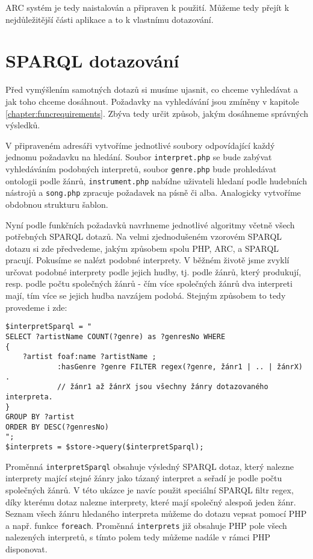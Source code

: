 ARC systém je tedy naistalován a připraven k použití. Můžeme tedy přejít k nejdůležitější části aplikace a to k vlastnímu dotazování. 

\section{SPARQL dotazování}

Před vymýšlením samotných dotazů si musíme ujasnit, co chceme vyhledávat a jak toho chceme dosáhnout. Požadavky na vyhledávání jsou zmíněny v kapitole \ref{chapter:funcrequirements}.
Zbýva tedy určit způsob, jakým dosáhneme správných výsledků. 

V připraveném adresáři vytvoříme jednotlivé soubory odpovídající každý jednomu požadavku na hledání.
Soubor \verb|interpret.php| se bude zabývat vyhledáváním podobných interpretů,
soubor \verb|genre.php| bude prohledávat ontologii podle žánrů,
\verb|instrument.php| nabídne uživateli hledaní podle hudebních nástrojů a 
\verb|song.php| zpracuje požadavek na písně či alba.
Analogicky vytvoříme obdobnou strukturu šablon.

Nyní podle funkčních požadavků navrhneme jednotlivé algoritmy včetně všech potřebných SPARQL dotazů. 
Na velmi zjednodušeném vzorovém SPARQL dotazu si zde předvedeme, jakým způsobem spolu PHP, ARC, a SPARQL pracují.
Pokusíme se nalézt podobné interprety. V běžném životě jsme zvyklí určovat podobné interprety podle jejich hudby, tj. podle žánrů, který produkují, 
resp. podle počtu společných žánrů - čím více společných žánrů dva interpreti mají, tím více se jejich hudba navzájem podobá. 
Stejným způsobem to tedy provedeme i zde:
\begin{verbatim}
$interpretSparql = "
SELECT ?artistName COUNT(?genre) as ?genresNo WHERE
{
    ?artist foaf:name ?artistName ;
            :hasGenre ?genre FILTER regex(?genre, žánr1 | .. | žánrX) .
            // žánr1 až žánrX jsou všechny žánry dotazovaného interpreta.
}
GROUP BY ?artist
ORDER BY DESC(?genresNo)
";
$interprets = $store->query($interpretSparql);
\end{verbatim}

Proměnná \verb|interpretSparql| obsahuje výsledný SPARQL dotaz, který nalezne interprety mající stejné žánry jako tázaný interpret a seřadí je podle počtu společných žánrů. 
V této ukázce je navíc použit speciální SPARQL filtr regex, díky kterému dotaz nalezne interprety, které mají společný alespoň jeden žánr.
Seznam všech žánru hledaného interpreta můžeme do dotazu vepsat pomocí PHP a např. funkce \verb|foreach|.
Proměnná \verb|interprets| již obsahuje PHP pole všech nalezených interpretů, s tímto polem tedy můžeme nadále v rámci PHP disponovat. 

